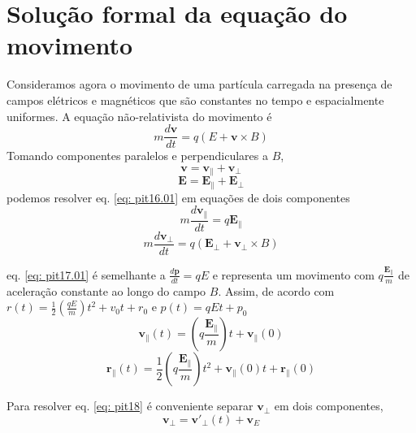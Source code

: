 \documentclass[12pt,oneside,a4paper]{abntex2}
\begin{document}
\section{Solução formal da equação do movimento}
\noindent Consideramos agora o movimento de uma partícula carregada na presença de campos elétricos e magnéticos que são constantes no tempo e espacialmente uniformes. A equação não-relativista do movimento é
\begin{equation}
\label{eq: pit16.01}
m \frac{d\bm{v}}{dt}= q(E+\bm{v} \times B)
\end{equation}
Tomando componentes paralelos e perpendiculares a $B$,
\begin{equation}
\bm{v}=\bm{v}_{\|}+\bm{v}_{\bot}
\end{equation}
\begin{equation}
\bm{E}=\bm{E}_{\|}+\bm{E}_{\bot}
\end{equation}
podemos resolver eq. \ref{eq: pit16.01}  em equações de dois componentes
\begin{equation}
\label{eq: pit17.01}
m \frac{d\bm{v}_{\|}}{dt}= q\bm{E}_{\|}
\end{equation}
\begin{equation}
\label{eq: pit18}
m \frac{d\bm{v}_{\bot}}{dt}= q(\bm{E}_{\bot}+\bm{v}_{\bot} \times B)
\end{equation}

eq. \ref{eq: pit17.01} é semelhante a $\frac{d\bm{p}}{dt}= q E$ e representa um movimento com $q\frac{\bm{E}_{\|}}{m}$ de aceleração constante ao longo do campo $B$. Assim, de acordo com $r(t) = \frac{1}{2}(\frac{qE}{m})t^2+v_0t+r_0$ e $p(t) = q E t + p_0$
\begin{equation}
\bm{v}_{\|}(t)= (q\frac{\bm{E}_{\|}}{m})t+\bm{v}_{\|}(0)
\end{equation}
\begin{equation}
\bm{r}_{\|}(t)=\frac{1}{2}(q\frac{\bm{E}_{\|}}{m})t^2+\bm{v}_{\|}(0)t+\bm{r}_{\|}(0)
\end{equation}

Para resolver eq. \ref{eq: pit18} é conveniente separar  $\bm{v}_{\bot}$ em dois componentes,
\begin{equation}
\label{eq: pit19.01}
\bm{v}_{\bot} = \bm{v'}_{\bot}(t)+\bm{v}_E
\end{equation}
\end{document}
